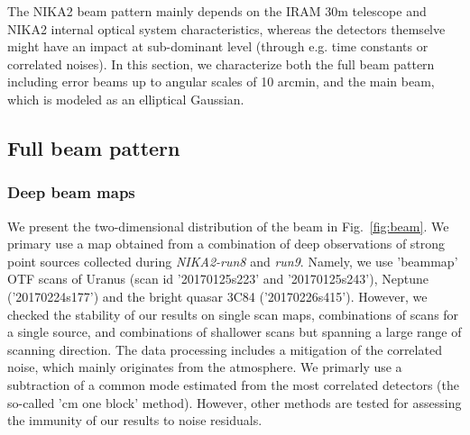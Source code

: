 

The NIKA2 beam pattern mainly depends on the IRAM 30m telescope and NIKA2 internal optical system characteristics, whereas the detectors themselve might have an impact at sub-dominant level (through e.g. time constants or correlated noises). In this section, we characterize both the full beam pattern including error beams up to angular scales of 10 arcmin, and the main beam, which is modeled as an elliptical Gaussian.

\subsection{Full beam pattern}

\subsubsection{Deep beam maps}
We present the two-dimensional distribution of the beam in Fig.~\ref{fig:beam}. We primary use a map obtained from a combination of deep observations of strong point sources collected during \emph{NIKA2-run8} and \emph{run9}. Namely, we use 'beammap' OTF scans of Uranus (scan id '20170125s223' and '20170125s243'),  Neptune ('20170224s177') and the bright quasar 3C84 ('20170226s415'). However, we checked the stability of our results on single scan maps, combinations of scans for a single source, and combinations of shallower scans but spanning a large range of scanning direction. The data processing includes a mitigation of the correlated noise, which mainly originates from the atmosphere.  We primarly use a subtraction of a common mode estimated from the most correlated detectors (the so-called 'cm one block' method). However, other methods are tested for assessing the immunity of our results to noise residuals.

